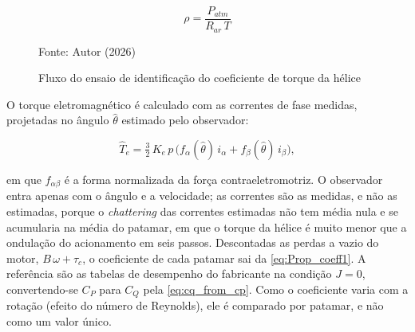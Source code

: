 \begin{equation}
    \rho = \frac{P_{atm}}{R_{ar}\,T}
    \label{eq:densidade_calculo}
\end{equation}

\begin{figure}[H]
    \centering
    \caption{Fluxo do ensaio de identificação do coeficiente de torque da hélice}
    \label{fig:fluxo_ensaio_helice}

    Fonte: Autor (2026)
\end{figure}

O torque eletromagnético é calculado com as correntes de fase medidas,
projetadas no ângulo $\hat{\theta}$ estimado pelo observador:

\begin{equation}
    \hat{T}_e = \tfrac{3}{2}\,K_e\,p\,\big(f_\alpha(\hat{\theta})\,i_\alpha
               + f_\beta(\hat{\theta})\,i_\beta\big),
    \label{eq:torque_corrente_medida}
\end{equation}

\noindent em que $f_{\alpha\beta}$ é a forma normalizada da força
contraeletromotriz. O observador entra apenas com o ângulo e a velocidade; as
correntes são as medidas, e não as estimadas, porque o \textit{chattering} das
correntes estimadas não tem média nula e se acumularia na média do patamar,
em que o torque da hélice é muito menor que a ondulação do acionamento em seis
passos. Descontadas as perdas a vazio do motor,
$B\,\omega + \tau_c$, o coeficiente de cada patamar sai da
\autoref{eq:Prop_coeff1}. A referência são as tabelas de desempenho do
fabricante \cite{apc_performance_data} na condição $J = 0$, convertendo-se
$C_P$ para $C_Q$ pela \autoref{eq:cq_from_cp}. Como o coeficiente varia com a
rotação (efeito do número de Reynolds), ele é comparado por patamar, e não
como um valor único.

